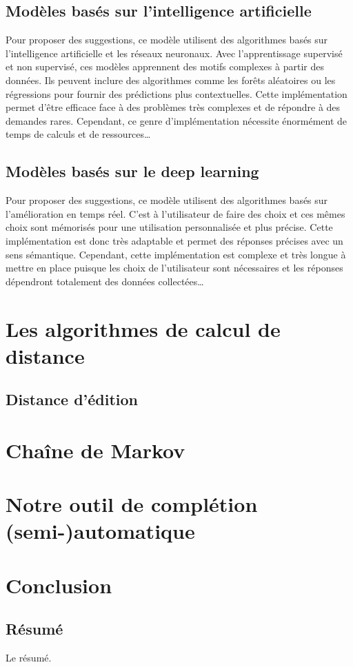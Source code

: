 \documentclass[a4paper, 11pt]{report}
\begin{document}
\section{Modèles basés sur l'intelligence artificielle}
Pour proposer des suggestions, ce modèle utilisent des algorithmes basés sur l'intelligence artificielle et les réseaux neuronaux. 
Avec l’apprentissage supervisé et non supervisé, ces modèles apprennent des motifs complexes à partir des données. Ils peuvent inclure des algorithmes comme les forêts aléatoires ou les régressions pour fournir des prédictions plus contextuelles.
Cette implémentation permet d'être efficace face à des problèmes très complexes et de répondre à des demandes rares. Cependant, ce genre d'implémentation nécessite énormément de temps de calculs et de ressources\dots


\section{Modèles basés sur le deep learning}
Pour proposer des suggestions, ce modèle utilisent des algorithmes basés sur l'amélioration en temps réel. C'est à l'utilisateur de faire des choix et ces mêmes choix sont mémorisés pour une utilisation personnalisée et plus précise. Cette implémentation est donc très adaptable et permet des réponses précises avec un sens sémantique. Cependant, cette implémentation est complexe et très longue à mettre en place puisque les choix de l'utilisateur sont nécessaires et les réponses dépendront totalement des données collectées\dots  



\chapter{Les algorithmes de calcul de distance}

\section{Distance d'édition}

\chapter{Chaîne de Markov}

\chapter{Notre outil de complétion (semi-)automatique}

\chapter*{Conclusion}
\newpage
\begin{center}
    \vspace*{\fill} %
    \section*{Résumé}
    \begin{justify}
Le résumé.
    \end{justify}
\end{center}
\end{document}
